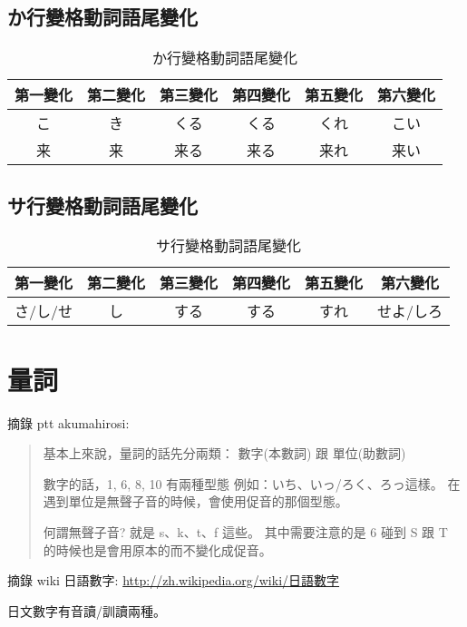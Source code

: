 \documentclass[12pt]{article}
\begin{document}
\begin{CJK}{UTF8}{cwku}
\subsection{か行變格動詞語尾變化}
\begin{table}[htdp]
\begin{tabular}{cccccc}
\hline
第一變化 & 第二變化 & 第三變化 & 第四變化 & 第五變化 & 第六變化 \\
\hline
こ & き & くる & くる & くれ& こい \\
来 & 来 & 来る & 来る & 来れ& 来い \\
\hline
\end{tabular}
\caption{か行變格動詞語尾變化}
\end{table}

\subsection{サ行變格動詞語尾變化}
\begin{table}[htdp]
\begin{tabular}{cccccc}
\hline
第一變化 & 第二變化 & 第三變化 & 第四變化 & 第五變化 & 第六變化 \\
\hline
さ/し/せ & し & する & する & すれ& せよ/しろ \\
\hline
\end{tabular}
\caption{サ行變格動詞語尾變化}
\end{table}

\section{量詞}

摘錄 ptt akumahirosi:
\begin{quote}
  基本上來說，量詞的話先分兩類： 數字(本數詞)  跟  單位(助數詞)

  數字的話，1, 6, 8, 10 有兩種型態
  例如：いち、いっ/ろく、ろっ這樣。
  在遇到單位是無聲子音的時候，會使用促音的那個型態。

  何謂無聲子音? 就是 s、k、t、f 這些。
  其中需要注意的是 6 碰到 S 跟 T 的時候也是會用原本的而不變化成促音。
\end{quote}

摘錄 wiki 日語數字: \href{http://zh.wikipedia.org/wiki/%E6%97%A5%E8%AA%9E%E6%95%B8%E5%AD%97}{http://zh.wikipedia.org/wiki/日語數字}

日文數字有音讀/訓讀兩種。


\end{CJK}
\end{document}
